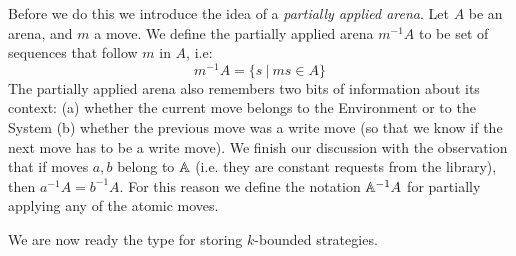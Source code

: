 Before we do this we introduce the idea of a \emph{partially applied arena}.
Let $A$ be an arena, and $m$ a move. We define the partially applied arena ${m^{-1}}A$ 
to be set of sequences that follow $m$ in $A$, i.e:
\[m^{-1}A = \{s \ | \ ms \in A \}\]
The partially applied arena also remembers two bits of information about its context: (a) whether the current move belongs to the Environment or to the System
(b) whether the previous move was a write move (so that we know if the next move has to be a write move). We finish our discussion with the observation 
that if moves $a, b$ belong to $\mathbb A$ (i.e. they are constant requests from the library), then $a^{-1}A = b^{-1}A$. 
For this reason we define the notation $\mathbb A^{-1}A$ for partially applying any of the atomic moves. 


We are now ready the type for storing $k$-bounded strategies. 
